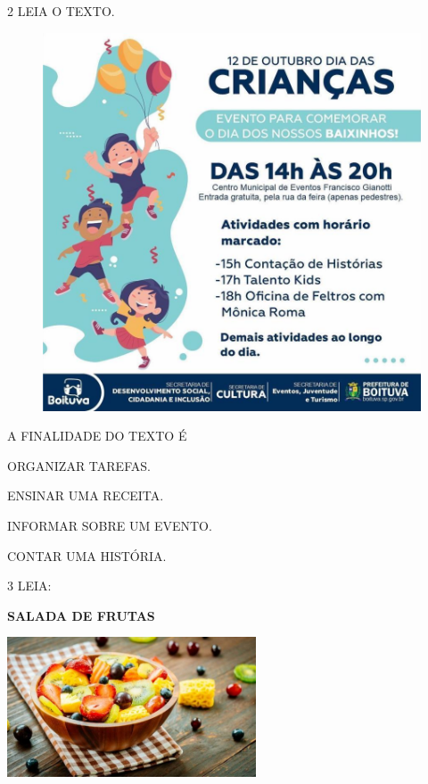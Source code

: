 \pagebreak
\num{2} LEIA O TEXTO.

\begin{figure}[htpb!]
\centering
\includegraphics[width=\textwidth]{media/image158.jpg}
\end{figure}

A FINALIDADE DO TEXTO É

\begin{escolha}
\item ORGANIZAR TAREFAS.

\item ENSINAR UMA RECEITA.

\item INFORMAR SOBRE UM EVENTO.

\item CONTAR UMA HISTÓRIA.
\end{escolha}

\pagebreak
\num{3} LEIA:

\textbf{SALADA DE FRUTAS}

\includegraphics[width=2.90350in,height=1.63264in]{media/image159.jpg}

